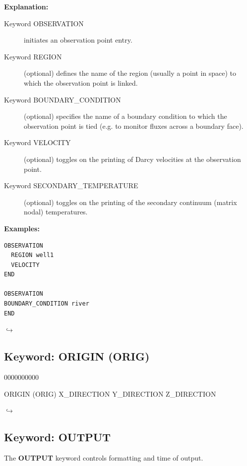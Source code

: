 \documentclass[12pt]{article}
\newcommand\return{{\hfill$\hookrightarrow$}}
\begin{document}
{\noindent\bf Explanation:}
\begin{description}
\item[Keyword OBSERVATION] initiates an observation point entry.
\item[Keyword REGION] (optional) defines the name of the region (usually a point in space) to which the observation point is linked.
\item[Keyword BOUNDARY\_CONDITION] (optional) specifies the name of a boundary condition to which the observation point is tied (e.g. to monitor fluxes across a boundary face).
\item[Keyword VELOCITY] (optional) toggles on the printing of Darcy velocities at the observation point.
\item[Keyword SECONDARY\_TEMPERATURE] (optional) toggles on the printing of the secondary continuum (matrix nodal) temperatures.
\end{description}

{\noindent\bf Examples:}
\begin{verbatim}
OBSERVATION
  REGION well1
  VELOCITY
END

OBSERVATION
BOUNDARY_CONDITION river
END
\end{verbatim}

\hyperlink{target_key}{\return}


\newpage
\protect\hypertarget{target_orig}{}

\subsection{Keyword: ORIGIN (ORIG)}
\begin{deflist}{0000000000}
\item[ORIGIN (ORIG)] X\_DIRECTION Y\_DIRECTION Z\_DIRECTION
\end{deflist}

\hyperlink{target_key}{\return}



\newpage
\protect\hypertarget{target_output}{}

\subsection{Keyword: OUTPUT}

 The {\bf OUTPUT} keyword controls formatting and time of output.
\end{document}
